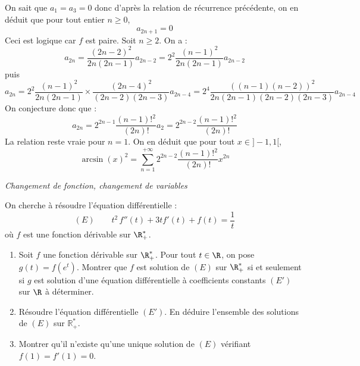 \documentclass[a4paper,10pt]{report}
\begin{document}
\begin{enumerate}
On sait que $a_1=a_3=0$ donc d'après la relation de récurrence précédente, on en déduit que pour tout entier $n \geq 0$,
$$ a_{2n+1}=0$$
Ceci est logique car $f$ est paire.  Soit $n \geq 2$. On a :
$$ a_{2n} = \dfrac{(2n-2)^2}{2n(2n-1)} a_{2n-2} = 2^2 \dfrac{(n-1)^2}{2n(2n-1)} a_{2n-2}$$
puis
$$ a_{2n} = 2^2 \dfrac{(n-1)^2}{2n(2n-1)} \times \dfrac{(2n-4)^2}{(2n-2)(2n-3)}a_{2n-4} = 2^4 \dfrac{((n-1)(n-2))^2}{2n(2n-1)(2n-2)(2n-3)} a_{2n-4}$$
On conjecture donc que :
$$ a_{2n} = 2^{2n-1} \dfrac{(n-1)!^2}{(2n)!} a_2 = 2^{2n-2} \dfrac{(n-1)!^2}{(2n)!}$$
La relation reste vraie pour $n=1$. On en déduit que pour tout $x \in ]-1,1[$,
$$ \arcsin(x)^2 = \sum_{n=1}^{+ \infty} 2^{2n-2} \dfrac{(n-1)!^2}{(2n)!} x^{2n}$$
\end{enumerate}

\medskip

\begin{center}
\textit{{ {\large Changement de fonction, changement de variables}}}
\end{center}

\medskip

\begin{Exa} On cherche à résoudre l'équation différentielle :
$$ (E) \qquad t^2\,f''(t) + 3 t f'(t)+f(t)  = \dfrac{1}{t} $$
où $f$ est une fonction dérivable sur $\R_+^*$.
\begin{enumerate}
\item Soit $f$ une fonction dérivable sur $\R_+^*$. Pour tout $t\in \R$, on pose $g(t)=f(e^{t})$. Montrer que $f$ est solution de $(E)$ sur $\R_+^*$ si et seulement si $g$ est solution d'une équation différentielle à coefficients constants $(E')$ sur $\R$ à déterminer.
\item Résoudre l'équation différentielle $(E')$. En déduire l'ensemble des solutions de $(E)$ sur $\mathbb{R}^*_+$.
\item Montrer qu'il n'existe qu'une unique solution de $(E)$ vérifiant $f(1)=f'(1)=0$.
\end{enumerate}
\end{Exa}
\end{document}
